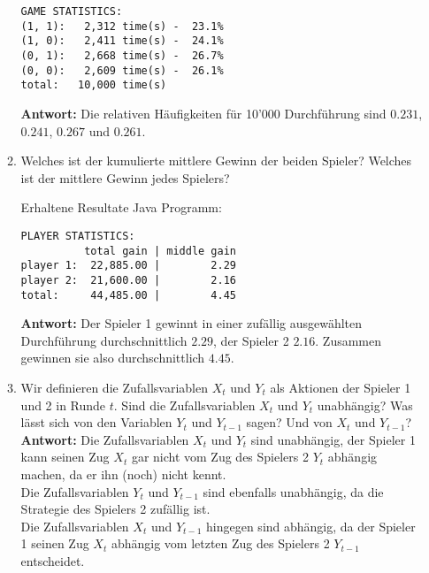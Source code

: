 \documentclass[12pt,a4paper]{article}
\begin{document}
\begin{enumerate}
\begin{enumerate}
\begin{verbatim}
GAME STATISTICS:
(1, 1):   2,312 time(s) -  23.1%
(1, 0):   2,411 time(s) -  24.1%
(0, 1):   2,668 time(s) -  26.7%
(0, 0):   2,609 time(s) -  26.1%
total:   10,000 time(s)
\end{verbatim}
\textbf{Antwort:} Die relativen Häufigkeiten für 10'000 Durchführung sind $0.231$, $0.241$, $0.267$ und $0.261$.

\item Welches ist der kumulierte mittlere Gewinn der beiden Spieler?
Welches ist der mittlere Gewinn jedes Spielers?
\begin{center}Erhaltene Resultate Java Programm:\end{center}
\begin{verbatim}
PLAYER STATISTICS:
          total gain | middle gain
player 1:  22,885.00 |        2.29
player 2:  21,600.00 |        2.16
total:     44,485.00 |        4.45
\end{verbatim}
\textbf{Antwort:} Der Spieler 1 gewinnt in einer zufällig ausgewählten Durchführung durchschnittlich $2.29$, der Spieler 2 $2.16$.
Zusammen gewinnen sie also durchschnittlich $4.45$.
\newpage

\item Wir definieren die Zufallsvariablen $X_t$ und $Y_t$ als Aktionen der Spieler 1 und 2 in Runde $t$.
Sind die Zufallsvariablen $X_t$ und $Y_t$ unabhängig? Was lässt sich von den Variablen $Y_t$ und $Y_{t-1}$ sagen?
Und von $X_t$ und $Y_{t-1}$?\\
\textbf{Antwort:} Die Zufallsvariablen $X_t$ und $Y_t$ sind unabhängig, der Spieler 1 kann seinen Zug $X_t$ gar nicht vom Zug des Spielers 2 $Y_t$ abhängig machen, da er ihn (noch) nicht kennt.\\
Die Zufallsvariablen $Y_t$ und $Y_{t-1}$ sind ebenfalls unabhängig, da die Strategie des Spielers 2 zufällig ist.\\
Die Zufallsvariablen $X_t$ und $Y_{t-1}$ hingegen sind abhängig, da der Spieler 1 seinen Zug $X_t$ abhängig vom letzten Zug des Spielers 2 $Y_{t-1}$ entscheidet.


\end{enumerate}
\end{enumerate}
\end{document}
